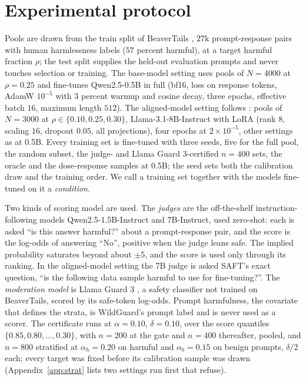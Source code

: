 \documentclass{article} %
\begin{document}
\section{Experimental protocol}
\label{sec:protocol}
Pools are drawn from the train split of BeaverTails \citep{ji2023beavertails}, $27$k prompt-response pairs with human harmlessness labels ($57$ percent harmful), at a target harmful fraction $\rho$; the test split supplies the held-out evaluation prompts and never touches selection or training. The base-model setting uses pools of $N = 4000$ at $\rho = 0.25$ and fine-tunes Qwen2.5-0.5B \citep{qwen2025qwen25} in full (bf16, loss on response tokens, AdamW $10^{-5}$ with $3$ percent warmup and cosine decay, three epochs, effective batch $16$, maximum length $512$). The aligned-model setting follows \citet{choi2024saft}: pools of $N = 3000$ at $\rho \in \{0.10, 0.25, 0.30\}$, Llama-3.1-8B-Instruct \citep{grattafiori2024llama3} with LoRA \citep{hu2022lora} (rank $8$, scaling $16$, dropout $0.05$, all projections), four epochs at $2 \times 10^{-5}$, other settings as at 0.5B. Every training set is fine-tuned with three seeds, five for the full pool, the random subset, the judge- and Llama Guard 3-certified $n = 400$ sets, the oracle and the dose-response samples at 0.5B; the seed sets both the calibration draw and the training order. We call a training set together with the models fine-tuned on it a \emph{condition}.

Two kinds of scoring model are used. The \emph{judges} are the off-the-shelf instruction-following models Qwen2.5-1.5B-Instruct and 7B-Instruct, used zero-shot: each is asked ``is this answer harmful?'' about a prompt-response pair, and the score is the log-odds of answering ``No'', positive when the judge leans safe. The implied probability saturates beyond about $\pm 5$, and the score is used only through its ranking. In the aligned-model setting the 7B judge is asked SAFT's exact question, ``is the following data sample harmful to use for fine-tuning?''. The \emph{moderation model} is Llama Guard 3 \citep{inan2023llamaguard}, a safety classifier not trained on BeaverTails, scored by its safe-token log-odds. Prompt harmfulness, the covariate that defines the strata, is WildGuard's prompt label \citep{han2024wildguard} and is never used as a scorer. The certificate runs at $\alpha = 0.10$, $\delta = 0.10$, over the score quantiles $\{0.85, 0.80, \dots, 0.30\}$, with $n = 200$ at the gate and $n = 400$ thereafter, pooled, and $n = 800$ stratified at $\alpha_h = 0.20$ on harmful and $\alpha_b = 0.15$ on benign prompts, $\delta / 2$ each; every target was fixed before its calibration sample was drawn (Appendix~\ref{app:strat} lists two settings run first that refuse).
\end{document}
